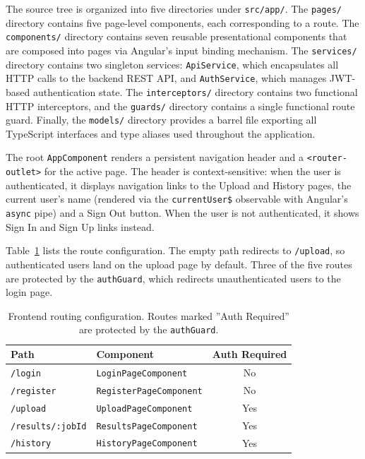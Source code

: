 The source tree is organized into five directories under \texttt{src/app/}. The \texttt{pages/} directory contains five page-level components, each corresponding to a route. The \texttt{components/} directory contains seven reusable presentational components that are composed into pages via Angular's input binding mechanism. The \texttt{services/} directory contains two singleton services: \texttt{ApiService}, which encapsulates all HTTP calls to the backend REST API, and \texttt{AuthService}, which manages JWT-based authentication state. The \texttt{interceptors/} directory contains two functional HTTP interceptors, and the \texttt{guards/} directory contains a single functional route guard. Finally, the \texttt{models/} directory provides a barrel file exporting all TypeScript interfaces and type aliases used throughout the application.

The root \texttt{AppComponent} renders a persistent navigation header and a \texttt{<rou\-ter-out\-let>} for the active page. The header is context-sensitive: when the user is authenticated, it displays navigation links to the Upload and History pages, the current user's name (rendered via the \texttt{currentUser\$} observable with Angular's \texttt{async} pipe) and a Sign Out button. When the user is not authenticated, it shows Sign In and Sign Up links instead.
\fi

Table~\ref{tab:frontend-routes} lists the route configuration. The empty path redirects to \texttt{/upload}, so authenticated users land on the upload page by default. Three of the five routes are protected by the \texttt{authGuard}, which redirects unauthenticated users to the login page.

\begin{table}[htbp]
    \centering
    \footnotesize
    \begin{tabular}{|l|l|c|}
        \hline
        \textbf{Path}            & \textbf{Component}             & \textbf{Auth Required} \\
        \hline\hline
        \texttt{/login}          & \texttt{LoginPageComponent}    & No                     \\
        \hline
        \texttt{/register}       & \texttt{RegisterPageComponent} & No                     \\
        \hline
        \texttt{/upload}         & \texttt{UploadPageComponent}   & Yes                    \\
        \hline
        \texttt{/results/:jobId} & \texttt{ResultsPageComponent}  & Yes                    \\
        \hline
        \texttt{/history}        & \texttt{HistoryPageComponent}  & Yes                    \\
        \hline
    \end{tabular}
    \caption{Frontend routing configuration. Routes marked ''Auth Required'' are protected by the \texttt{authGuard}.}
    \label{tab:frontend-routes}
\end{table}

